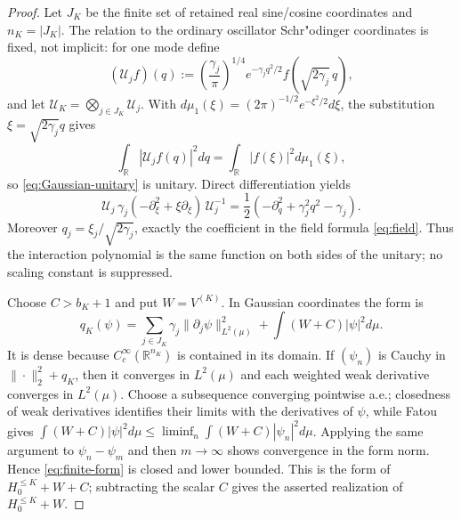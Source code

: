 \documentclass[11pt,a4paper]{article}
\theoremstyle{plain}
\theoremstyle{definition}
\newcommand{\R}{\mathbb{R}}
\newcommand{\muv}{\mu}
\begin{document}
\begin{proof}
Let $J_K$ be the finite set of retained real sine/cosine coordinates and
$n_K=|J_K|$.  The relation to the ordinary oscillator Schr"odinger
coordinates is fixed, not implicit: for one mode define
\begin{equation}
 (\mathscr U_jf)(q)
 :=\left(\frac{\gamma_j}{\pi}\right)^{1/4}
   e^{-\gamma_jq^2/2}f(\sqrt{2\gamma_j}\,q),                        \label{eq:Gaussian-unitary}
\end{equation}
and let $\mathscr U_K=\bigotimes_{j\in J_K}\mathscr U_j$.  With
$d\muv_1(\xi)=(2\pi)^{-1/2}e^{-\xi^2/2}d\xi$, the substitution
$\xi=\sqrt{2\gamma_j}q$ gives
\[
 \int_\R|\mathscr U_jf(q)|^2dq
 =\int_\R|f(\xi)|^2d\muv_1(\xi),
\]
so \eqref{eq:Gaussian-unitary} is unitary.  Direct differentiation yields
\begin{equation}
 \mathscr U_j\,\gamma_j(-\partial_\xi^2+\xi\partial_\xi)\,
 \mathscr U_j^{-1}
 =\frac12(-\partial_q^2+\gamma_j^2q^2-\gamma_j).                   \label{eq:Gaussian-conjugacy}
\end{equation}
Moreover $q_j=\xi_j/\sqrt{2\gamma_j}$, exactly the coefficient in
the field formula \eqref{eq:field}.  Thus the interaction polynomial is the same
function on both sides of the unitary; no scaling constant is suppressed.

Choose $C>b_K+1$ and put $W=V^{(K)}$.  In Gaussian coordinates the form is
\begin{equation}
 q_K(\psi)=\sum_{j\in J_K}\gamma_j\|\partial_j\psi\|_{L^2(\muv)}^2
 +\int(W+C)|\psi|^2d\muv .                                       \label{eq:finite-form}
\end{equation}
It is dense because $C_c^\infty(\R^{n_K})$ is contained in its domain.
If $(\psi_n)$ is Cauchy in $\|\cdot\|_2^2+q_K$, then it converges in
$L^2(\muv)$ and each weighted weak derivative converges in $L^2(\muv)$.
Choose a subsequence converging pointwise a.e.; closedness of weak
derivatives identifies their limits with the derivatives of $\psi$, while
Fatou gives
$\int(W+C)|\psi|^2d\muv\le\liminf_n\int(W+C)|\psi_n|^2d\muv$.
Applying the same argument to $\psi_n-\psi_m$ and then $m\to\infty$ shows
convergence in the form norm.  Hence \eqref{eq:finite-form} is closed and
lower bounded.  This is the form of $H_0^{\le K}+W+C$; subtracting the scalar
$C$ gives the asserted realization of $H_0^{\le K}+W$.


\end{proof}
\end{document}
